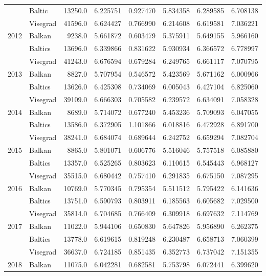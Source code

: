 \documentclass[11pt]{article}
\begin{document}
\begin{table}[!htbp]
{\begin{tabular}{llrrrrrr}
     & Baltic &  13250.0 &  6.225751 &  0.927470 &  5.834358 &  6.289585 &  6.708138 \\
     & Visegrad &  41596.0 &  6.624427 &  0.766990 &  6.214608 &  6.619581 &  7.036221 \\
2012 & Balkan &   9238.0 &  5.661872 &  0.603479 &  5.375911 &  5.649155 &  5.966160 \\
     & Baltics &  13696.0 &  6.339866 &  0.831622 &  5.930934 &  6.366572 &  6.778997 \\
     & Visegrad &  41243.0 &  6.676594 &  0.679284 &  6.249765 &  6.661117 &  7.070795 \\
2013 & Balkan &   8827.0 &  5.707954 &  0.546572 &  5.423569 &  5.671162 &  6.000966 \\
     & Baltics &  13626.0 &  6.425308 &  0.734069 &  6.005043 &  6.427104 &  6.825060 \\
     & Visegrad &  39109.0 &  6.666303 &  0.705582 &  6.239572 &  6.634091 &  7.058328 \\
2014 & Balkan &   8689.0 &  5.714072 &  0.677240 &  5.453236 &  5.709093 &  6.047055 \\
     & Baltics &  13586.0 &  6.372905 &  1.101866 &  6.018816 &  6.472928 &  6.891700 \\
     & Visegrad &  38241.0 &  6.684074 &  0.689644 &  6.242752 &  6.659294 &  7.082704 \\
2015 & Balkan &   8865.0 &  5.801071 &  0.606776 &  5.516046 &  5.757518 &  6.085880 \\
     & Baltics &  13357.0 &  6.525265 &  0.803623 &  6.110615 &  6.545443 &  6.968127 \\
     & Visegrad &  35515.0 &  6.680442 &  0.757410 &  6.291835 &  6.675150 &  7.087295 \\
2016 & Balkan &  10769.0 &  5.770345 &  0.795354 &  5.511512 &  5.795422 &  6.141636 \\
     & Baltics &  13751.0 &  6.590793 &  0.803911 &  6.185563 &  6.605682 &  7.029500 \\
     & Visegrad &  35814.0 &  6.704685 &  0.766409 &  6.309918 &  6.697632 &  7.114769 \\
2017 & Balkan &  11022.0 &  5.944106 &  0.650830 &  5.647826 &  5.956890 &  6.262375 \\
     & Baltics &  13778.0 &  6.619615 &  0.819248 &  6.230487 &  6.658713 &  7.060399 \\
     & Visegrad &  36637.0 &  6.724185 &  0.851435 &  6.352773 &  6.737042 &  7.151355 \\
2018 & Balkan &  11075.0 &  6.042281 &  0.682581 &  5.753798 &  6.072441 &  6.399620 \\

\end{tabular}}
\end{table}
\end{document}
